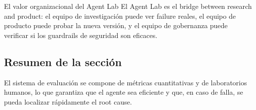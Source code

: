 \begin{knowledgebox}{El valor organizacional del Agent Lab}
El Agent Lab es el bridge between research and product: el equipo de investigación puede ver failure reales, el equipo de producto puede probar la nueva versión, y el equipo de gobernanza puede verificar si los guardrails de seguridad son eficaces.
\end{knowledgebox}

\subsection{Resumen de la sección}

El sistema de evaluación se compone de métricas cuantitativas y de laboratorios humanos, lo que garantiza que el agente sea eficiente y que, en caso de falla, se pueda localizar rápidamente el root cause.

